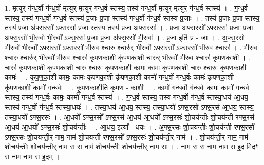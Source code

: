 \documentclass[17pt]{extarticle}
\begin{document}
1. मृ॒त्युर् ग॑न्ध॒र्वो ग॑न्ध॒र्वो मृ॒त्युर् मृ॒त्युर् ग॑न्ध॒र्व स्तस्य॒ तस्य॑ गन्ध॒र्वो मृ॒त्युर् मृ॒त्युर् ग॑न्ध॒र्व स्तस्य॑ । . ग॒न्ध॒र्व स्तस्य॒ तस्य॑ गन्ध॒र्वो ग॑न्ध॒र्व स्तस्य॑ प्र॒जाः प्र॒जा स्तस्य॑ गन्ध॒र्वो ग॑न्ध॒र्व स्तस्य॑ प्र॒जाः । . तस्य॑ प्र॒जाः प्र॒जा स्तस्य॒ तस्य॑ प्र॒जा अ॑फ्स॒रसो᳚ ऽफ्स॒रसः॑ प्र॒जा स्तस्य॒ तस्य॑ प्र॒जा अ॑फ्स॒रसः॑ । . प्र॒जा अ॑फ्स॒रसो᳚ ऽफ्स॒रसः॑ प्र॒जाः प्र॒जा अ॑फ्स॒रसो॑ भी॒रुवो॑ भी॒रुवो᳚ ऽफ्स॒रसः॑ प्र॒जाः प्र॒जा अ॑फ्स॒रसो॑ भी॒रुवः॑ । . प्र॒जा इति॑ प्र - जाः । . अ॒फ्स॒रसो॑ भी॒रुवो॑ भी॒रुवो᳚ ऽफ्स॒रसो᳚ ऽफ्स॒रसो॑ भी॒रुव॒ श्चारु॒ श्चारु॑र् भी॒रुवो᳚ ऽफ्स॒रसो᳚ ऽफ्स॒रसो॑ भी॒रुव॒ श्चारुः॑ । . भी॒रुव॒ श्चारु॒ श्चारु॑र् भी॒रुवो॑ भी॒रुव॒ श्चारुः॑ कृपणका॒शी कृ॑पणका॒शी चारु॑र् भी॒रुवो॑ भी॒रुव॒ श्चारुः॑ कृपणका॒शी । . चारुः॑ कृपणका॒शी कृ॑पणका॒शी चारु॒ श्चारुः॑ कृपणका॒शी कामः॒ कामः॑ कृपणका॒शी चारु॒ श्चारुः॑ कृपणका॒शी कामः॑ । . कृ॒प॒ण॒का॒शी कामः॒ कामः॑ कृपणका॒शी कृ॑पणका॒शी कामो॑ गन्ध॒र्वो ग॑न्ध॒र्वः कामः॑ कृपणका॒शी कृ॑पणका॒शी कामो॑ गन्ध॒र्वः । . कृ॒प॒ण॒का॒शीति॑ कृपण - का॒शी । . कामो॑ गन्ध॒र्वो ग॑न्ध॒र्वः कामः॒ कामो॑ गन्ध॒र्व स्तस्य॒ तस्य॑ गन्ध॒र्वः कामः॒ कामो॑ गन्ध॒र्व स्तस्य॑ । . ग॒न्ध॒र्व स्तस्य॒ तस्य॑ गन्ध॒र्वो ग॑न्ध॒र्व स्तस्या॒धय॑ आ॒धय॒ स्तस्य॑ गन्ध॒र्वो ग॑न्ध॒र्व 
स्तस्या॒धयः॑ । . तस्या॒धय॑ आ॒धय॒ स्तस्य॒ तस्या॒धयो᳚ ऽफ्स॒रसो᳚ ऽफ्स॒रस॑ आ॒धय॒ स्तस्य॒ तस्या॒धयो᳚ ऽफ्स॒रसः॑ । . आ॒धयो᳚ ऽफ्स॒रसो᳚ ऽफ्स॒रस॑ आ॒धय॑ आ॒धयो᳚ ऽफ्स॒रसः॑ शो॒चय॑न्तीः शो॒चय॑न्ती रफ्स॒रस॑ आ॒धय॑ 
आ॒धयो᳚ ऽफ्स॒रसः॑ शो॒चय॑न्तीः । . आ॒धय॒ इत्या᳚ - धयः॑ । . अ॒फ्स॒रसः॑ शो॒चय॑न्तीः शो॒चय॑न्ती रफ्स॒रसो᳚ ऽफ्स॒रसः॑ शो॒चय॑न्ती॒र् नाम॒ नाम॑ शो॒चय॑न्ती 
रफ्स॒रसो᳚ ऽफ्स॒रसः॑ शो॒चय॑न्ती॒र् नाम॑ । . शो॒चय॑न्ती॒र् नाम॒ नाम॑ शो॒चय॑न्तीः शो॒चय॑न्ती॒र् नाम॒ स स नाम॑ शो॒चय॑न्तीः शो॒चय॑न्ती॒र् नाम॒ सः । . नाम॒ स स नाम॒ नाम॒ स इ॒द मि॒दꣳ स नाम॒ नाम॒ स इ॒दम् । \newline
\end{document}

